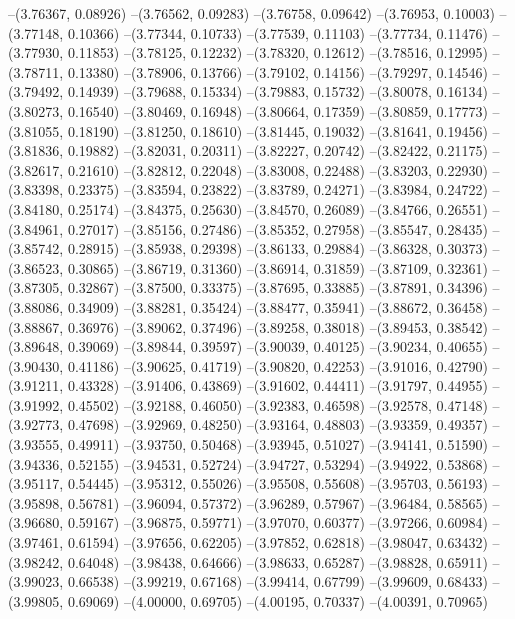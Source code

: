 --(3.76367, 0.08926)
--(3.76562, 0.09283)
--(3.76758, 0.09642)
--(3.76953, 0.10003)
--(3.77148, 0.10366)
--(3.77344, 0.10733)
--(3.77539, 0.11103)
--(3.77734, 0.11476)
--(3.77930, 0.11853)
--(3.78125, 0.12232)
--(3.78320, 0.12612)
--(3.78516, 0.12995)
--(3.78711, 0.13380)
--(3.78906, 0.13766)
--(3.79102, 0.14156)
--(3.79297, 0.14546)
--(3.79492, 0.14939)
--(3.79688, 0.15334)
--(3.79883, 0.15732)
--(3.80078, 0.16134)
--(3.80273, 0.16540)
--(3.80469, 0.16948)
--(3.80664, 0.17359)
--(3.80859, 0.17773)
--(3.81055, 0.18190)
--(3.81250, 0.18610)
--(3.81445, 0.19032)
--(3.81641, 0.19456)
--(3.81836, 0.19882)
--(3.82031, 0.20311)
--(3.82227, 0.20742)
--(3.82422, 0.21175)
--(3.82617, 0.21610)
--(3.82812, 0.22048)
--(3.83008, 0.22488)
--(3.83203, 0.22930)
--(3.83398, 0.23375)
--(3.83594, 0.23822)
--(3.83789, 0.24271)
--(3.83984, 0.24722)
--(3.84180, 0.25174)
--(3.84375, 0.25630)
--(3.84570, 0.26089)
--(3.84766, 0.26551)
--(3.84961, 0.27017)
--(3.85156, 0.27486)
--(3.85352, 0.27958)
--(3.85547, 0.28435)
--(3.85742, 0.28915)
--(3.85938, 0.29398)
--(3.86133, 0.29884)
--(3.86328, 0.30373)
--(3.86523, 0.30865)
--(3.86719, 0.31360)
--(3.86914, 0.31859)
--(3.87109, 0.32361)
--(3.87305, 0.32867)
--(3.87500, 0.33375)
--(3.87695, 0.33885)
--(3.87891, 0.34396)
--(3.88086, 0.34909)
--(3.88281, 0.35424)
--(3.88477, 0.35941)
--(3.88672, 0.36458)
--(3.88867, 0.36976)
--(3.89062, 0.37496)
--(3.89258, 0.38018)
--(3.89453, 0.38542)
--(3.89648, 0.39069)
--(3.89844, 0.39597)
--(3.90039, 0.40125)
--(3.90234, 0.40655)
--(3.90430, 0.41186)
--(3.90625, 0.41719)
--(3.90820, 0.42253)
--(3.91016, 0.42790)
--(3.91211, 0.43328)
--(3.91406, 0.43869)
--(3.91602, 0.44411)
--(3.91797, 0.44955)
--(3.91992, 0.45502)
--(3.92188, 0.46050)
--(3.92383, 0.46598)
--(3.92578, 0.47148)
--(3.92773, 0.47698)
--(3.92969, 0.48250)
--(3.93164, 0.48803)
--(3.93359, 0.49357)
--(3.93555, 0.49911)
--(3.93750, 0.50468)
--(3.93945, 0.51027)
--(3.94141, 0.51590)
--(3.94336, 0.52155)
--(3.94531, 0.52724)
--(3.94727, 0.53294)
--(3.94922, 0.53868)
--(3.95117, 0.54445)
--(3.95312, 0.55026)
--(3.95508, 0.55608)
--(3.95703, 0.56193)
--(3.95898, 0.56781)
--(3.96094, 0.57372)
--(3.96289, 0.57967)
--(3.96484, 0.58565)
--(3.96680, 0.59167)
--(3.96875, 0.59771)
--(3.97070, 0.60377)
--(3.97266, 0.60984)
--(3.97461, 0.61594)
--(3.97656, 0.62205)
--(3.97852, 0.62818)
--(3.98047, 0.63432)
--(3.98242, 0.64048)
--(3.98438, 0.64666)
--(3.98633, 0.65287)
--(3.98828, 0.65911)
--(3.99023, 0.66538)
--(3.99219, 0.67168)
--(3.99414, 0.67799)
--(3.99609, 0.68433)
--(3.99805, 0.69069)
--(4.00000, 0.69705)
--(4.00195, 0.70337)
--(4.00391, 0.70965)
